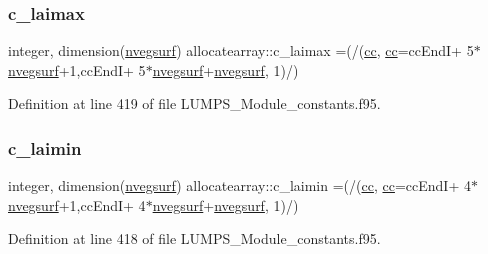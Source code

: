 \mbox{\label{namespaceallocatearray_a3879c23638459d93fbf49398238d480d}} 
\subsubsection{\texorpdfstring{c\+\_\+laimax}{c\_laimax}}
{\footnotesize\ttfamily integer, dimension(\hyperlink{namespaceallocatearray_abb987c3b35dd321963fd53d38f10236f}{nvegsurf}) allocatearray\+::c\+\_\+laimax =(/(\hyperlink{namespaceallocatearray_ac863c81704eb507dee10f5e10741e10c}{cc}, \hyperlink{namespaceallocatearray_ac863c81704eb507dee10f5e10741e10c}{cc}=cc\+EndI+ 5$\ast$\hyperlink{namespaceallocatearray_abb987c3b35dd321963fd53d38f10236f}{nvegsurf}+1,cc\+EndI+ 5$\ast$\hyperlink{namespaceallocatearray_abb987c3b35dd321963fd53d38f10236f}{nvegsurf}+\hyperlink{namespaceallocatearray_abb987c3b35dd321963fd53d38f10236f}{nvegsurf}, 1)/)}



Definition at line 419 of file L\+U\+M\+P\+S\+\_\+\+Module\+\_\+constants.\+f95.

\mbox{\label{namespaceallocatearray_a76848439645a7bb8eb68647882c6b41a}} 
\subsubsection{\texorpdfstring{c\+\_\+laimin}{c\_laimin}}
{\footnotesize\ttfamily integer, dimension(\hyperlink{namespaceallocatearray_abb987c3b35dd321963fd53d38f10236f}{nvegsurf}) allocatearray\+::c\+\_\+laimin =(/(\hyperlink{namespaceallocatearray_ac863c81704eb507dee10f5e10741e10c}{cc}, \hyperlink{namespaceallocatearray_ac863c81704eb507dee10f5e10741e10c}{cc}=cc\+EndI+ 4$\ast$\hyperlink{namespaceallocatearray_abb987c3b35dd321963fd53d38f10236f}{nvegsurf}+1,cc\+EndI+ 4$\ast$\hyperlink{namespaceallocatearray_abb987c3b35dd321963fd53d38f10236f}{nvegsurf}+\hyperlink{namespaceallocatearray_abb987c3b35dd321963fd53d38f10236f}{nvegsurf}, 1)/)}



Definition at line 418 of file L\+U\+M\+P\+S\+\_\+\+Module\+\_\+constants.\+f95.

\mbox{\label{namespaceallocatearray_ad2db44e21325d357681aede71f6ceba1}} 
